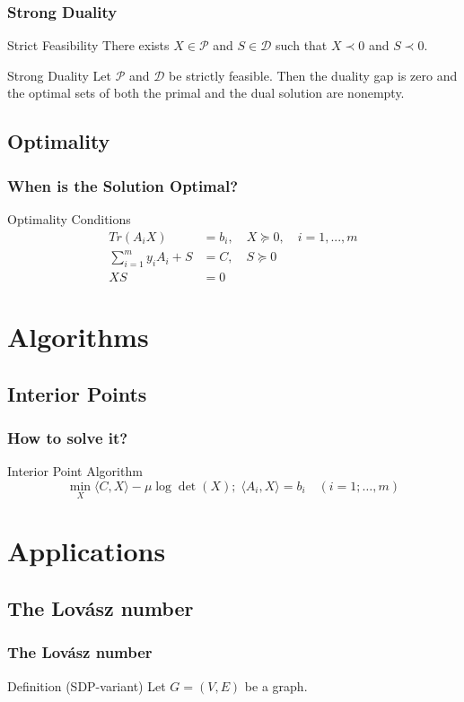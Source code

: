 \documentclass[11pt]{beamer}
\begin{document}
\begin{frame}
	\frametitle{Strong Duality}
	\begin{block}{Strict Feasibility}
		There exists $X\in\mathcal{P}$ and $S\in\mathcal{D}$ such that $X\prec 0$ and $S\prec 0$.
	\end{block}
	\begin{block}{Strong Duality}
		Let $\mathcal{P}$ and $\mathcal{D}$ be strictly feasible. Then the duality gap is zero and the optimal sets of both the primal and the dual solution are nonempty.
	\end{block}
\end{frame}
\subsection{Optimality}
	\begin{frame}
		\frametitle{When is the Solution Optimal?}
		\begin{block}{Optimality Conditions}
			\begin{equation*}
			\begin{aligned}
			Tr(A_iX)&=b_i,\quad X\succeq 0,\quad i=1,...,m\\
			\sum_{i=1}^{m}y_iA_i+S&=C,\quad S\succeq 0\\
			XS&=0
			\end{aligned}
			\end{equation*}
		\end{block}
	\end{frame}
\section{Algorithms}
\subsection{Interior Points}
\begin{frame}
	\frametitle{How to solve it?}
	\begin{block}{Interior Point Algorithm}
		\begin{equation*}
			\min_X {\langle C,X \rangle - \mu\log\det(X);\;\langle A_i,X \rangle=b_i\quad(i=1;\dots,m)}
		\end{equation*}
	\end{block}
\end{frame}
\section{Applications}
\subsection{The Lovász number}
\begin{frame}
	\frametitle{The Lovász number}
	\begin{block}{Definition (SDP-variant)}
		Let $G=(V,E)$ be a graph.
	\end{block}
\end{frame}
\end{document}
